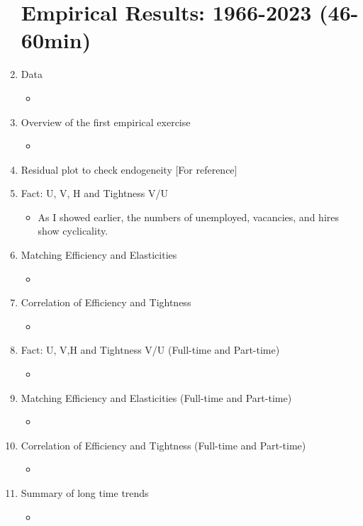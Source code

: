 \documentclass[12pt]{article}
\begin{document}
\begin{enumerate}
    \section{Empirical Results: 1966-2023 (46-60min)}
    \item Data
    \begin{itemize}
        \item 
    \end{itemize}
    \item Overview of the first empirical exercise
    \begin{itemize}
        \item 
    \end{itemize}
    \item Residual plot to check endogeneity [For reference]
    \item Fact: U, V, H and Tightness V/U
    \begin{itemize}
        \item As I showed earlier, the numbers of unemployed, vacancies, and hires show cyclicality.
    \end{itemize}
    \item Matching Efficiency and Elasticities
    \begin{itemize}
        \item 
    \end{itemize}
    \item Correlation of Efficiency and Tightness
    \begin{itemize}
        \item 
    \end{itemize}
    \item Fact: U, V,H and Tightness V/U (Full-time and Part-time)
    \begin{itemize}
        \item 
    \end{itemize}
    \item Matching Efficiency and Elasticities (Full-time and Part-time)
    \begin{itemize}
        \item 
    \end{itemize}
    \item Correlation of Efficiency and Tightness (Full-time and Part-time)
    \begin{itemize}
        \item 
    \end{itemize}
    \item Summary of long time trends
    \begin{itemize}
        \item 
    \end{itemize}

\end{enumerate}
\end{document}
